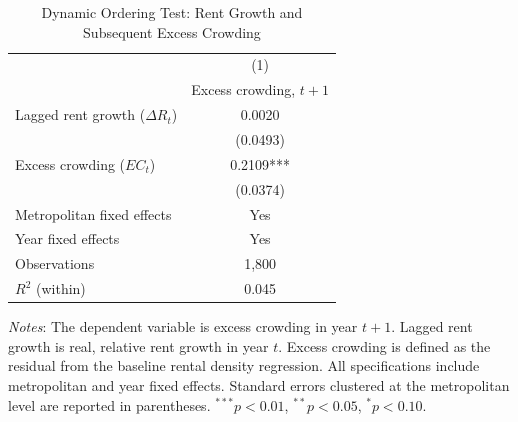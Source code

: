 \begin{table}[!htbp]
\centering
\caption{Dynamic Ordering Test: Rent Growth and Subsequent Excess Crowding}
\label{tab:granger_crowding}
\begin{tabular}{l c}
\hline\hline
 & (1) \\
 & Excess crowding, $t+1$ \\
\hline
Lagged rent growth ($\Delta R_t$) & 0.0020 \\
                                 & (0.0493) \\
Excess crowding ($EC_t$)          & 0.2109*** \\
                                 & (0.0374) \\
\hline
Metropolitan fixed effects & Yes \\
Year fixed effects         & Yes \\
Observations               & 1,800 \\
$R^{2}$ (within)           & 0.045 \\
\hline\hline
\end{tabular}

\begin{flushleft}
\footnotesize
\textit{Notes}: The dependent variable is excess crowding in year $t+1$.
Lagged rent growth is real, relative rent growth in year $t$. Excess crowding is defined
as the residual from the baseline rental density regression. All specifications include
metropolitan and year fixed effects. Standard errors clustered at the metropolitan level
are reported in parentheses.
$^{***}p<0.01$, $^{**}p<0.05$, $^{*}p<0.10$.
\end{flushleft}
\end{table}
